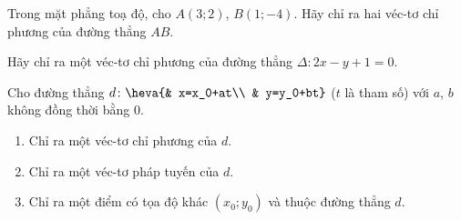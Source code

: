 \begin{bt}%
	Trong mặt phẳng toạ độ, cho  $A(3;2)$, $B(1;-4)$. Hãy chỉ ra  hai  véc-tơ chỉ phương  của đường  thẳng $AB$.
\end{bt}

\begin{bt}%
	Hãy chỉ ra một véc-tơ  chỉ phương  của đường thẳng $\Delta \colon 2x-y+1=0$.
\end{bt}

\begin{bt}%
	Cho đường thẳng $d\colon \heva{& x=x_0+at\\ & y=y_0+bt}$ ($t$ là tham số) với $a$, $b$ không đồng thời bằng $0$.
	\begin{enumerate}
		\item Chỉ ra một véc-tơ chỉ phương của $d$.
		\item Chỉ ra một véc-tơ pháp tuyến của $d$.
		\item Chỉ ra một điểm có tọa độ khác $(x_0;y_0)$ và thuộc đường thẳng $d$.
	\end{enumerate}
\end{bt}

